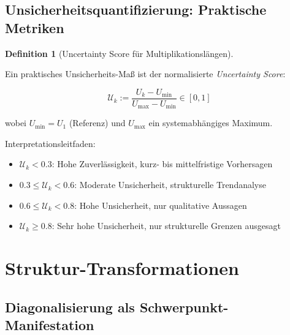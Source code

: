 \documentclass[a4paper,12pt]{article}
\theoremstyle{definition}
\newtheorem{definition}{Definition}
\begin{document}
\subsection{Unsicherheitsquantifizierung: Praktische Metriken}

\begin{definition}[Uncertainty Score für Multiplikationslängen]
\label{def:uncertainty_score}

Ein praktisches Unsicherheits-Maß ist der normalisierte \emph{Uncertainty Score}:

\[
\mathcal{U}_k := \frac{U_k - U_{\min}}{U_{\max} - U_{\min}} \in [0, 1]
\]

wobei $U_{\min} = U_1$ (Referenz) und $U_{\max}$ ein systemabhängiges Maximum.

Interpretationsleitfaden:
\begin{itemize}
\item $\mathcal{U}_k < 0.3$: Hohe Zuverlässigkeit, kurz- bis mittelfristige Vorhersagen
\item $0.3 \leq \mathcal{U}_k < 0.6$: Moderate Unsicherheit, strukturelle Trendanalyse
\item $0.6 \leq \mathcal{U}_k < 0.8$: Hohe Unsicherheit, nur qualitative Aussagen
\item $\mathcal{U}_k \geq 0.8$: Sehr hohe Unsicherheit, nur strukturelle Grenzen ausgesagt
\end{itemize}
\end{definition}

\section{Struktur-Transformationen}

\subsection{Diagonalisierung als Schwerpunkt-Manifestation}
\end{document}

